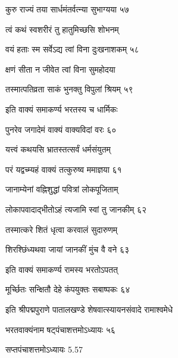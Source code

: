 कुरु राज्यं तया सार्धमंतर्वत्न्या सुभाग्यया ५७

त्वं कथं स्वशरीरं तु हातुमिच्छसि शोभनम्

वयं हताः स्म सर्वेऽद्य त्वां विना दुःखनाशकम् ५८

क्षणं सीता न जीवेत त्वां विना सुमहोदया

तस्मात्पतिव्रता साकं भुनक्तु विपुलां श्रियम् ५९

इति वाक्यं समाकर्ण्य भरतस्य च धार्मिकः

पुनरेव जगादेमं वाक्यं वाक्यविदां वरः ६०

यत्त्वं कथयसि भ्रातस्तत्सर्वं धर्मसंयुतम्

परं यद्वच्म्यहं वाक्यं तत्कुरुष्व ममाज्ञया ६१

जानाम्येनां वह्निशुद्धां पवित्रां लोकपूजिताम्

लोकापवादाद्भीतोऽहं त्यजामि स्वां तु जानकीम् ६२

तस्मात्करे शितं धृत्वा करवालं सुदारुणम्

शिरश्छिंध्यथवा जायां जानकीं मुंच वै वने ६३

इति वाक्यं समाकर्ण्य रामस्य भरतोऽपतत्

मूर्च्छितः सन्क्षितौ देहे कंपयुक्तः सबाष्पकः ६४

इति श्रीपद्मपुराणे पातालखण्डे शेषवात्स्यायनसंवादे रामाश्वमेधे

भरतवाक्यंनाम षट्पंचाशत्तमोऽध्यायः ५६

सप्तपंचाशत्तमोऽध्यायः 5.57


